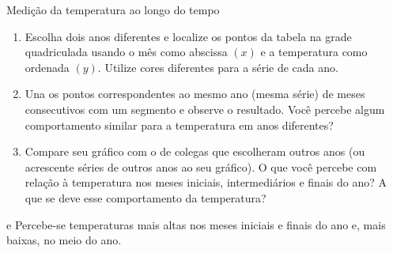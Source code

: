 {\begin{task}{Medição da temperatura ao longo do tempo}
\begin{enumerate}
\item {} 
Escolha dois anos diferentes e localize os pontos da tabela na grade quadriculada usando o mês como abscissa $(x)$ e a temperatura como ordenada $(y)$. Utilize cores diferentes para a série de cada ano.

\item {} 
Una os pontos correspondentes ao mesmo ano (mesma série) de meses consecutivos com um segmento e observe o resultado. Você percebe algum comportamento similar para a  temperatura em anos diferentes?

\item {} 
Compare seu gráfico com o de colegas que escolheram outros anos (ou acrescente séries de outros anos ao seu gráfico). O que você percebe com relação à temperatura nos meses iniciais, intermediários e finais do ano?  A que se deve esse comportamento da temperatura?

\end{enumerate}



 e  Percebe-se temperaturas mais altas nos meses iniciais e finais do ano e, mais baixas, no meio do ano.

\begin{figure}[H]
\centering

\end{figure}
\end{task}}
